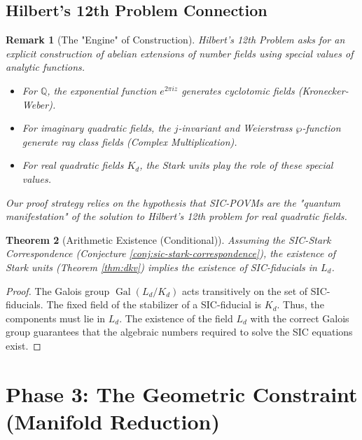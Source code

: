 \documentclass[a4paper,11pt]{article}
\newtheorem{theorem}{Theorem}[section]
\newtheorem{remark}[theorem]{Remark}
\DeclareMathOperator{\Gal}{Gal}
\newcommand{\Q}{\mathbb{Q}}
\begin{document}
\subsection{Hilbert's 12th Problem Connection}

\begin{remark}[The "Engine" of Construction]
Hilbert's 12th Problem asks for an explicit construction of abelian extensions of number fields using special values of analytic functions.
\begin{itemize}
    \item For $\Q$, the exponential function $e^{2\pi i z}$ generates cyclotomic fields (Kronecker-Weber).
    \item For imaginary quadratic fields, the $j$-invariant and Weierstrass $\wp$-function generate ray class fields (Complex Multiplication).
    \item For real quadratic fields $K_d$, the Stark units play the role of these special values.
\end{itemize}
Our proof strategy relies on the hypothesis that SIC-POVMs are the "quantum manifestation" of the solution to Hilbert's 12th problem for real quadratic fields.
\end{remark}

\begin{theorem}[Arithmetic Existence (Conditional)]\label{thm:arithmetic-existence}
Assuming the SIC-Stark Correspondence (Conjecture \ref{conj:sic-stark-correspondence}), the existence of Stark units (Theorem \ref{thm:dkv}) implies the existence of SIC-fiducials in $L_d$.
\end{theorem}

\begin{proof}
The Galois group $\Gal(L_d/K_d)$ acts transitively on the set of SIC-fiducials. The fixed field of the stabilizer of a SIC-fiducial is $K_d$. Thus, the components must lie in $L_d$. The existence of the field $L_d$ with the correct Galois group guarantees that the algebraic numbers required to solve the SIC equations exist.
\end{proof}

\section{Phase 3: The Geometric Constraint (Manifold Reduction)}
\end{document}
